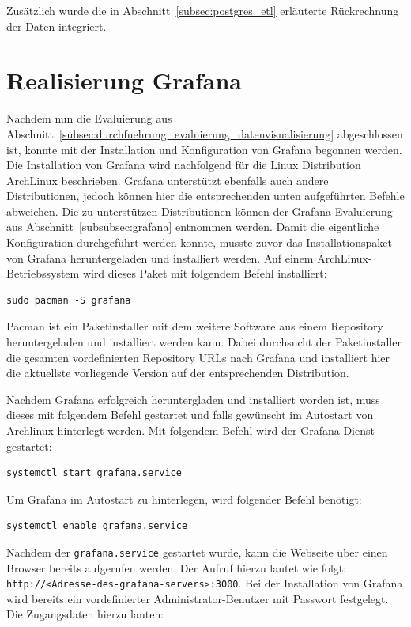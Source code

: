 Zusätzlich wurde die in Abschnitt~\ref{subsec:postgres_etl} erläuterte
Rückrechnung der Daten integriert.
\nl%

\section{Realisierung Grafana}
\label{sec:realisierung_grafana}
Nachdem nun die Evaluierung aus
Abschnitt~\ref{subsec:durchfuehrung_evaluierung_datenvisualisierung}
abgeschlossen ist, konnte mit der Installation und Konfiguration von Grafana
begonnen werden. Die Installation von Grafana wird nachfolgend für die Linux
Distribution ArchLinux beschrieben. Grafana unterstützt ebenfalls auch andere
Distributionen, jedoch können hier die entsprechenden unten aufgeführten
Befehle abweichen. Die zu unterstützen Distributionen können der Grafana
Evaluierung aus Abschnitt~\ref{subsubsec:grafana} entnommen werden. Damit die
eigentliche Konfiguration durchgeführt werden konnte, musste zuvor das
Installationspaket von Grafana heruntergeladen und installiert werden. Auf
einem ArchLinux\hyp{}Betriebssystem wird dieses Paket mit folgendem Befehl
installiert:

\begin{verbatim}
sudo pacman -S grafana
\end{verbatim}

Pacman ist ein Paketinstaller mit dem weitere Software aus einem
\gls{Repository} heruntergeladen und installiert werden kann. Dabei durchsucht
der Paketinstaller die gesamten vordefinierten \gls{Repository} URLs nach
Grafana und installiert hier die aktuellste vorliegende Version auf der
entsprechenden Distribution.

Nachdem Grafana erfolgreich heruntergladen und installiert worden ist, muss
dieses mit folgendem Befehl gestartet und falls gewünscht im Autostart von
Archlinux hinterlegt werden. Mit folgendem Befehl wird der Grafana\hyp{}Dienst
gestartet:

\begin{verbatim}
systemctl start grafana.service
\end{verbatim}

Um Grafana im Autostart zu hinterlegen, wird folgender Befehl benötigt:

\begin{verbatim}
systemctl enable grafana.service
\end{verbatim}

Nachdem der \texttt{grafana.service} gestartet wurde, kann die Webseite über
einen Browser bereits aufgerufen werden. Der Aufruf hierzu lautet wie folgt:
\texttt{http://<Adresse-des-grafana-servers>:3000}. Bei der Installation von
Grafana wird bereits ein vordefinierter Administrator\hyp{}Benutzer mit
Passwort festgelegt. Die Zugangsdaten hierzu lauten:

